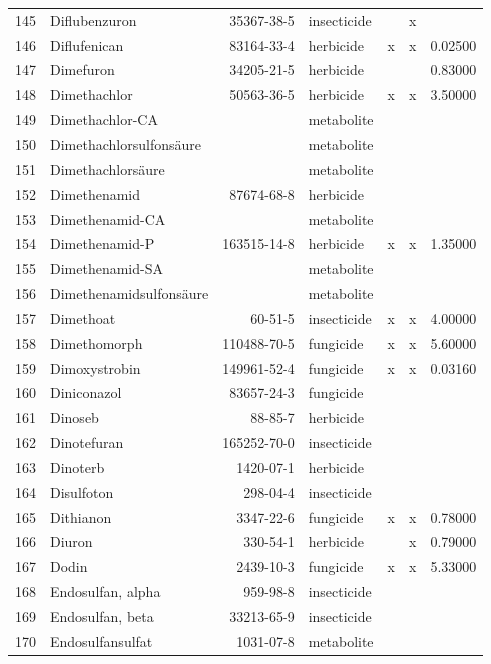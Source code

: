 \begin{longtable}{lp{3cm}rlp{1cm}p{1cm}p{1.5cm}}
  145 & Diflubenzuron & 35367-38-5 & insecticide &  & x &  \\ 
  146 & Diflufenican & 83164-33-4 & herbicide & x & x & 0.02500 \\ 
  147 & Dimefuron & 34205-21-5 & herbicide &  &  & 0.83000 \\ 
  148 & Dimethachlor & 50563-36-5 & herbicide & x & x & 3.50000 \\ 
  149 & Dimethachlor-CA &  & metabolite &  &  &  \\ 
  150 & Dimethachlor\-sulfonsäure &  & metabolite &  &  &  \\ 
  151 & Dimethachlorsäure &  & metabolite &  &  &  \\ 
  152 & Dimethenamid & 87674-68-8 & herbicide &  &  &  \\ 
  153 & Dimethenamid-CA &  & metabolite &  &  &  \\ 
  154 & Dimethenamid-P & 163515-14-8 & herbicide & x & x & 1.35000 \\ 
  155 & Dimethenamid-SA &  & metabolite &  &  &  \\ 
  156 & Dimethenamid\-sulfonsäure &  & metabolite &  &  &  \\ 
  157 & Dimethoat & 60-51-5 & insecticide & x & x & 4.00000 \\ 
  158 & Dimethomorph & 110488-70-5 & fungicide & x & x & 5.60000 \\ 
  159 & Dimoxystrobin & 149961-52-4 & fungicide & x & x & 0.03160 \\ 
  160 & Diniconazol & 83657-24-3 & fungicide &  &  &  \\ 
  161 & Dinoseb & 88-85-7 & herbicide &  &  &  \\ 
  162 & Dinotefuran & 165252-70-0 & insecticide &  &  &  \\ 
  163 & Dinoterb & 1420-07-1 & herbicide &  &  &  \\ 
  164 & Disulfoton & 298-04-4 & insecticide &  &  &  \\ 
  165 & Dithianon & 3347-22-6 & fungicide & x & x & 0.78000 \\ 
  166 & Diuron & 330-54-1 & herbicide &  & x & 0.79000 \\ 
  167 & Dodin & 2439-10-3 & fungicide & x & x & 5.33000 \\ 
  168 & Endosulfan, alpha & 959-98-8 & insecticide &  &  &  \\ 
  169 & Endosulfan, beta & 33213-65-9 & insecticide &  &  &  \\ 
  170 & Endosulfansulfat & 1031-07-8 & metabolite &  &  &  \\ 

\end{longtable}

